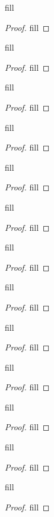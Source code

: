 \begin{exercise}{19}
fill
\end{exercise}
\begin{proof}
fill
\end{proof} 

\begin{exercise}{20}
fill
\end{exercise}
\begin{proof}
fill
\end{proof} 

\begin{exercise}{22}
fill
\end{exercise}
\begin{proof}
fill
\end{proof} 

\begin{exercise}{24}
fill
\end{exercise}
\begin{proof}
fill
\end{proof} 

\begin{exercise}{25}
fill
\end{exercise}
\begin{proof}
fill
\end{proof} 

\begin{exercise}{26}
fill
\end{exercise}
\begin{proof}
fill
\end{proof} 

\begin{exercise}{27}
fill
\end{exercise}
\begin{proof}
fill
\end{proof} 

\begin{exercise}{29}
fill
\end{exercise}
\begin{proof}
fill
\end{proof} 

\begin{exercise}{30}
fill
\end{exercise}
\begin{proof}
fill
\end{proof} 

\begin{exercise}{31}
fill
\end{exercise}
\begin{proof}
fill
\end{proof} 

\begin{exercise}{34}
fill
\end{exercise}
\begin{proof}
fill
\end{proof} 

\begin{exercise}{35}
fill
\end{exercise}
\begin{proof}
fill
\end{proof} 

\begin{exercise}{36}
fill
\end{exercise}
\begin{proof}
fill
\end{proof} 
